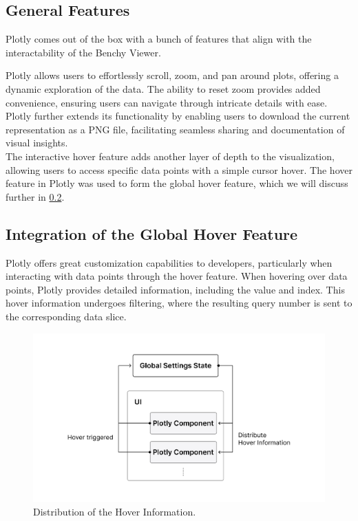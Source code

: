 \subsection{General Features}
Plotly comes out of the box with a bunch of features that align with the interactability of the Benchy Viewer.

Plotly allows users to effortlessly scroll, zoom, and pan around plots, offering a dynamic exploration of the data. The ability to reset zoom provides added convenience, ensuring users can navigate through intricate details with ease.\\
Plotly further extends its functionality by enabling users to download the current representation as a PNG file, facilitating seamless sharing and documentation of visual insights.\\
The interactive hover feature adds another layer of depth to the visualization, allowing users to access specific data points with a simple cursor hover. The hover feature in Plotly was used to form the global hover feature, which we will discuss further in \ref{sec:plotly-hover}.





\subsection{Integration of the Global Hover Feature}\label{sec:plotly-hover}

Plotly offers great customization capabilities to developers, particularly when interacting with data points through the hover feature. When hovering over data points, Plotly provides detailed information, including the value and index. This hover information undergoes filtering, where the resulting query number is sent to the corresponding data slice. 

\begin{figure}[h]
  \centering
  \includegraphics[width=0.8\linewidth]{figures/global-hover.png}
  \caption{Distribution of the Hover Information.}
  \label{fig:global-hover}
\end{figure}


